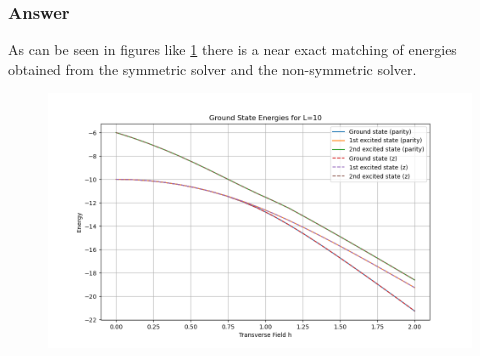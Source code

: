 \documentclass[12pt]{article}
\begin{document}
\subsubsection{Answer}
As can be seen in figures like \ref{fig:4-6_L12_energy} there is a near exact matching of energies obtained from the symmetric solver and the non-symmetric solver.
\begin{figure}[h]
\centering
\includegraphics[width=\textwidth]{4-6_L10_energies.png}
\label{fig:4-6_L12_energy}
\end{figure}
\end{document}
